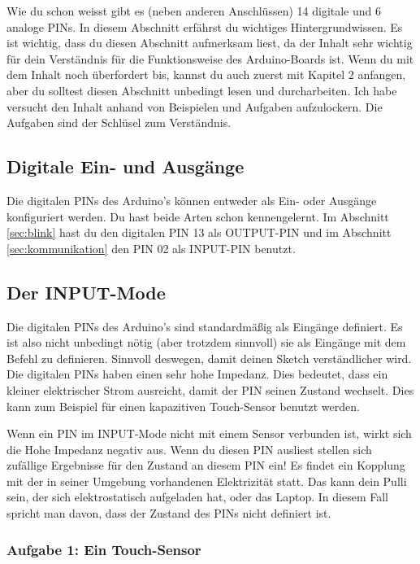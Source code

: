 Wie du schon weisst gibt es (neben anderen Anschlüssen) 14 digitale und 6 analoge PINs. In diesem Abschnitt erfährst du wichtiges Hintergrundwissen. Es ist wichtig, dass du diesen Abschnitt aufmerksam liest, da der Inhalt sehr wichtig für dein Verständnis für die Funktionsweise des Arduino-Boards ist. Wenn du mit dem Inhalt noch überfordert bis, kannst du auch zuerst mit Kapitel 2 anfangen, aber du solltest diesen Abschnitt unbedingt lesen und durcharbeiten. Ich habe versucht den Inhalt anhand von Beispielen und Aufgaben aufzulockern. Die Aufgaben sind der Schlüsel zum Verständnis.     

\subsection{Digitale Ein- und Ausgänge} 

Die digitalen PINs des Arduino's können entweder als Ein- oder Ausgänge konfiguriert werden. Du hast beide Arten schon kennengelernt. Im Abschnitt \ref{sec:blink} hast du den digitalen PIN 13 als OUTPUT-PIN  und im Abschnitt \ref{sec:kommunikation} den PIN 02 als INPUT-PIN benutzt.

\subsection{Der INPUT-Mode} 

Die digitalen PINs des Arduino's sind standardmäßig als Eingänge definiert. Es ist also nicht unbedingt nötig (aber trotzdem sinnvoll) sie als Eingänge mit dem Befehl  zu definieren. Sinnvoll deswegen, damit deinen Sketch verständlicher wird. Die digitalen PINs haben einen sehr hohe Impedanz.
 Dies bedeutet, dass ein kleiner elektrischer Strom ausreicht, damit der PIN seinen Zustand wechselt. Dies kann zum Beispiel für einen kapazitiven Touch-Sensor benutzt werden.

Wenn ein PIN im INPUT-Mode nicht mit einem Sensor verbunden ist, wirkt sich die Hohe Impedanz negativ aus. Wenn du diesen PIN ausliest stellen sich zufällige Ergebnisse für den Zustand an diesem PIN ein! Es findet ein Kopplung mit der in seiner Umgebung vorhandenen Elektrizität statt. Das kann dein Pulli sein, der sich elektrostatisch aufgeladen hat, oder das Laptop. In diesem Fall spricht man davon, dass der Zustand des PINs nicht definiert ist.  

\subsubsection{Aufgabe 1: Ein Touch-Sensor}

